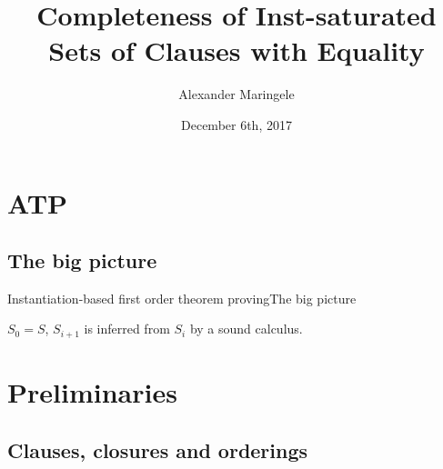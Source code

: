 \documentclass[%
handout,
]{beamer}
\title[Completeness of Inst-Saturation]{Completeness of Inst-saturated\\Sets of Clauses with Equality}
\author[{A$\ell$M}]{%
	Alexander Maringele
}
\institute[UIBK]{%
	{alexander.maringele@gmail.com}
}
\date{December 6th, 2017}
\begin{document}
\titleframe

\begin{frame}
    \nocite{GK2004csl} %
    
    
\end{frame}



\section{ATP}
\subsection{The big picture}
\begin{frame}{Instantiation-based first order theorem proving}{The big picture}

    \vspace{0.7em}
    

    \vspace{0.7em}
    $S_0 = S$, $S_{i+1}$ is inferred from $S_i$ by a sound calculus.
\end{frame}


\section{Preliminaries}

\subsection{Clauses, closures and orderings}
\end{document}
